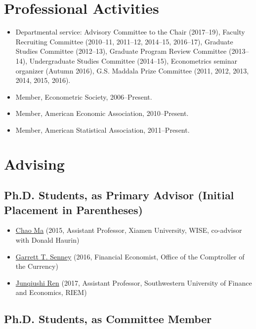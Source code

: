 \documentclass[10pt,letterpaper]{article}
\begin{document}
\section*{Professional Activities}

\begin{itemize}
\item Departmental service:
  Advisory Committee to the Chair (2017--19),
  Faculty Recruiting Committee (2010--11, 2011--12, 2014--15, 2016--17),
  Graduate Studies Committee (2012--13),
  Graduate Program Review Committee (2013--14),
  Undergraduate Studies Committee (2014--15),
  Econometrics seminar organizer (Autumn 2016),
  G.S. Maddala Prize Committee (2011, 2012, 2013, 2014, 2015, 2016).
\item Member, Econometric Society, 2006--Present.
\item Member, American Economic Association, 2010--Present.
\item Member, American Statistical Association, 2011--Present.
\end{itemize}

\section*{Advising}

\subsection*{Ph.D. Students, as Primary Advisor (Initial Placement in Parentheses)}

\begin{itemize}
\item \href{http://chaoma2014.weebly.com}{Chao Ma} (2015, Assistant Professor, Xiamen University, WISE, co-advisor with Donald Haurin)
\item \href{http://garrettsenney.weebly.com}{Garrett T. Senney} (2016, Financial Economist, Office of the Comptroller of the Currency)
\item \href{http://junqiushi-ren.weebly.com}{Junqiushi Ren} (2017, Assistant Professor, Southwestern University of Finance and Economics, RIEM) %
\end{itemize}

\subsection*{Ph.D. Students, as Committee Member}
\end{document}
